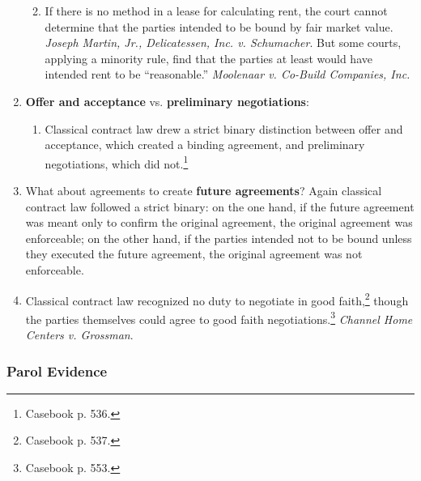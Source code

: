 \begin{enumerate}
\begin{enumerate}
\begin{enumerate}
        \end{enumerate}
        \item If there is no method in a lease for calculating rent, the court 
        cannot determine that the parties intended to be bound by fair market 
        value. \emph{Joseph Martin, Jr., Delicatessen, Inc. v. Schumacher}. 
        But some courts, applying a minority rule, find that the parties at 
        least would have intended rent to be ``reasonable.'' \emph{Moolenaar 
        v. Co-Build Companies, Inc.}
    \end{enumerate}
    \item \textbf{Offer and acceptance} vs. \textbf{preliminary 
    negotiations}:
    \begin{enumerate}
        \item Classical contract law drew a strict binary distinction between 
        offer and acceptance, which created a binding agreement, and 
        preliminary negotiations, which did not.\footnote{Casebook p. 536.}
    \end{enumerate}
    \item What about agreements to create \textbf{future agreements}? Again 
    classical contract law followed a strict binary: on the one hand, if the 
    future agreement was meant only to confirm the original agreement, the 
    original agreement was enforceable; on the other hand, if the parties 
    intended not to be bound unless they executed the future agreement, the 
    original agreement was not enforceable.
    \item Classical contract law recognized no duty to negotiate in good 
    faith,\footnote{Casebook p. 537.} though the parties themselves could 
    agree to good faith negotiations.\footnote{Casebook p. 553.} \emph{Channel 
    Home Centers v. Grossman}.
\end{enumerate}

\subsubsection{Parol Evidence}

